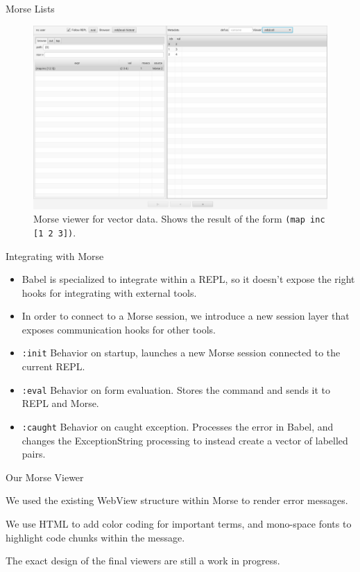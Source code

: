 \documentclass{beamer}
\begin{document}
\begin{frame}{Morse Lists}
  \begin{figure}
    \centering
    \includegraphics[width=\textwidth]{../resources/MorseSuccessfulForm.png}
    \caption{Morse viewer for vector data. Shows the result of the form \texttt{(map inc [1 2 3])}.}
    \label{fig:MorseVec}
  \end{figure}
\end{frame}


\begin{frame}{Integrating with Morse}
  \begin{itemize}
    \item<1-> Babel is specialized to integrate within a REPL, so it doesn't expose the right hooks for integrating with external tools.
    \item<2-> In order to connect to a Morse session, we introduce a new session layer that exposes communication hooks for other tools.
    \item<3-> \texttt{:init} Behavior on startup, launches a new Morse session connected to the current REPL.
    \item<4-> \texttt{:eval} Behavior on form evaluation. Stores the command and sends it to REPL and Morse.
    \item<5-> \texttt{:caught} Behavior on caught exception. Processes the error in Babel, and changes the Exception\leftarrow String processing to instead create a vector of labelled pairs.  
  \end{itemize}
\end{frame}

\begin{frame}{Our Morse Viewer}
  \item<1-> We used the existing WebView structure within Morse to render error messages.
  \item<2-> We use HTML to add color coding for important terms, and mono-space fonts to highlight code chunks within the message.
  \item<3-> The exact design of the final viewers are still a work in progress.
\end{frame}
\end{document}
